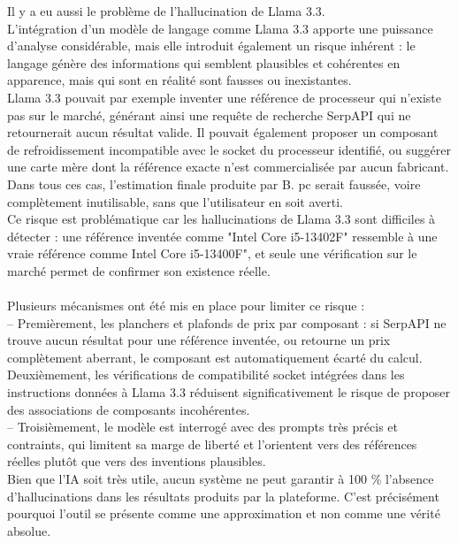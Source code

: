 \documentclass[a4paper, 12pt, twoside]{article}
\begin{document}
Il y a eu aussi le problème de l'hallucination de Llama 3.3.\\
L'intégration d'un modèle de langage comme Llama 3.3 apporte une puissance d'analyse considérable, mais elle introduit également un risque inhérent : le langage génère des informations qui semblent plausibles et cohérentes en apparence, mais qui sont en réalité sont fausses ou inexistantes.\\
Llama 3.3 pouvait par exemple inventer une référence de processeur qui n'existe pas sur le marché, générant ainsi une requête de recherche SerpAPI qui ne retournerait aucun résultat valide. Il pouvait également proposer un composant de refroidissement incompatible avec le socket du processeur identifié, ou suggérer une carte mère dont la référence exacte n'est commercialisée par aucun fabricant. Dans tous ces cas, l'estimation finale produite par B. pc serait faussée, voire complètement inutilisable, sans que l'utilisateur en soit averti.\\
Ce risque est problématique car les hallucinations de Llama 3.3 sont difficiles à détecter : une référence inventée comme "Intel Core i5-13402F" ressemble à une vraie référence comme Intel Core i5-13400F", et seule une vérification sur le marché permet de confirmer son existence réelle.\\
\\
Plusieurs mécanismes ont été mis en place pour limiter ce risque : \\
– Premièrement, les planchers et plafonds de prix par composant : si SerpAPI ne trouve aucun résultat pour une référence inventée, ou retourne un prix complètement aberrant, le composant est automatiquement écarté du calcul. \\Deuxièmement, les vérifications de compatibilité socket intégrées dans les instructions données à Llama 3.3 réduisent significativement le risque de proposer des associations de composants incohérentes. \\
– Troisièmement, le modèle est interrogé avec des prompts très précis et contraints, qui limitent sa marge de liberté et l'orientent vers des références réelles plutôt que vers des inventions plausibles.\\
Bien que l'IA soit très utile, aucun système ne peut garantir à 100 \% l'absence d'hallucinations dans les résultats produits par la plateforme. C'est précisément pourquoi l'outil se présente comme une approximation et non comme une vérité absolue.\\
\\
\end{document}

